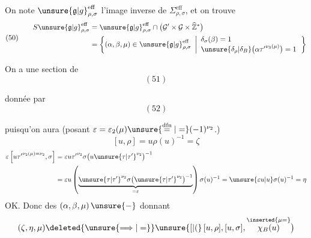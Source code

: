 On note
\(\unsure{\mathfrak{g}|g}_{\rho,\sigma}^{\mathrm{eff}}\)
l'image inverse de
\(\Sigma_{\rho,\sigma}^{\mathrm{eff}}\),
et on trouve
\[
(50)\qquad
\begin{aligned}
S\unsure{\mathfrak{g}|g}_{\rho,\sigma}^{\mathrm{eff}}
&=\unsure{\mathfrak{g}|g}_{\rho,\sigma}^{\mathrm{eff}}
\cap\bigl(\mathcal{G}'\times\mathcal{G}\times\widehat{\mathbb Z}^{*}\bigr)
\\
&=\left\{(\alpha,\beta,\mu)\in
\unsure{\mathfrak{g}|g}_{\rho,\sigma}^{\mathrm{eff}}
\ \left|
\begin{array}{l}
\delta_\sigma(\beta)=1\\
\unsure{\delta_\rho|\delta_B}\bigl(\alpha{\tau'}^{\nu_3(\mu)}\bigr)=1
\end{array}\right.\right\}
\end{aligned}
\]

On a une section de
\[
(51)
\]

donnée par
\[
(52)
\]

puisqu'on aura
(posant \(\varepsilon=\varepsilon_2(\mu)
\unsure{\overset{\mathrm{dfn}}{=}|=}
(-1)^{\nu_2}\).)
\[
[u,\rho]=u\rho(u)^{-1}=\zeta
\]
\[
\begin{aligned}
\varepsilon
\left[u{\tau'}^{\nu_2(\mu)=\nu_2},\sigma\right]
&=\varepsilon u{\tau'}^{\nu_2}
\sigma\bigl(u\unsure{\tau|\tau'}^{\nu_2}\bigr)^{-1}\\
&=\varepsilon u
\left(\underbrace{
\unsure{\tau|\tau'}^{\nu_2}
\sigma\bigl(\unsure{\tau|\tau'}^{\nu_2}\bigr)^{-1}
}_{=\varepsilon}\right)\sigma(u)^{-1}
=\unsure{\varepsilon u|u}\sigma(u)^{-1}=\eta
\end{aligned}
\]
OK. Donc
des \((\alpha,\beta,\mu)\,\unsure{-}\)
donnant 
\[
(\zeta,\eta,\mu)\deleted{\unsure{\Longrightarrow|=}}
\unsure{[|(}\,[u,\rho],[u,\sigma],
\overset{\inserted{\mu=}}{\chi_B(u)}\bigr)
\]


